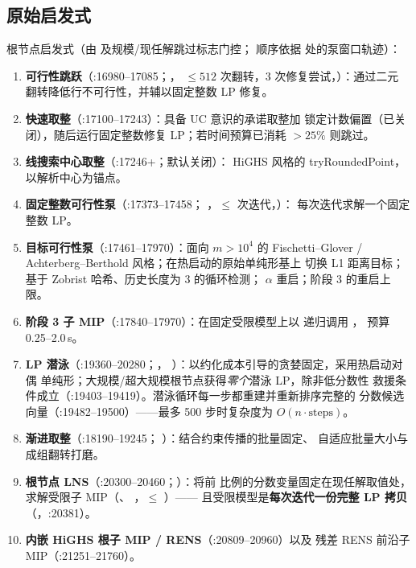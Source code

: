 \documentclass[11pt]{ctexart}
\begin{document}
\subsection{原始启发式}
\label{sec:heuristics}
根节点启发式（由  及规模/现任解跳过标志门控；
顺序依据  处的泵窗口轨迹）：
\begin{enumerate}[nosep]
\item \textbf{可行性跳跃}（:16980--17085；，
  $\le 512$ 次翻转，3 次修复尝试，）：通过二元
  翻转降低行不可行性，并辅以固定整数 LP 修复。
\item \textbf{快速取整}（:17100--17243）：具备 UC 意识的承诺取整加
  锁定计数偏置（已关闭），随后运行固定整数修复 LP；若时间预算已消耗
  $>25\%$ 则跳过。
\item \textbf{线搜索中心取整}（:17246+；默认关闭）：
  HiGHS 风格的 tryRoundedPoint，以解析中心为锚点。
\item \textbf{固定整数可行性泵}（:17373--17458；
  ，$\le$
   次迭代，）：
  每次迭代求解一个固定整数 LP。
\item \textbf{目标可行性泵}（:17461--17970）：面向 $m > 10^4$ 的
  Fischetti--Glover / Achterberg--Berthold 风格；在热启动的原始单纯形基上
  切换 L1 距离目标；基于 Zobrist 哈希、历史长度为 3 的循环检测；
  $\alpha$ 重启；阶段 3 的重启上限。
\item \textbf{阶段 3 子 MIP}（:17840--17970）：在固定受限模型上以
   递归调用 ，
  预算 0.25--2.0\,s。
\item \textbf{LP 潜泳}（:19360--20280；，
  ）：以约化成本引导的贪婪固定，采用热启动对偶
  单纯形；大规模/超大规模根节点获得\emph{零个}潜泳 LP，除非低分数性
  救援条件成立（:19403--19419）。潜泳循环每一步都重建并重新排序完整的
  分数候选向量（:19482--19500）——最多 500 步时复杂度为
  $O(n \cdot \mathrm{steps})$。
\item \textbf{渐进取整}（:18190--19245；
  ）：结合约束传播的批量固定、
  自适应批量大小与成组翻转打磨。
\item \textbf{根节点 LNS}（:20300--20460；）：将前
   比例的分数变量固定在现任解取值处，
  求解受限子 MIP（、
  ，$\le$ ）——
  且受限模型是\textbf{每次迭代一份完整 LP 拷贝}
  （，:20381）。
\item \textbf{内嵌 HiGHS 根子 MIP / RENS}（:20809--20960）以及
  残差 RENS 前沿子 MIP（:21251--21760）。
\end{enumerate}
\end{document}
